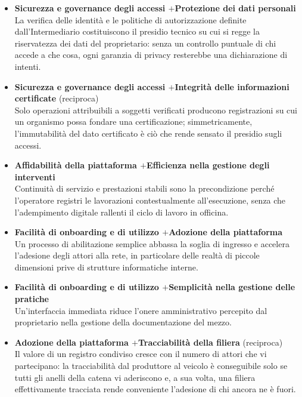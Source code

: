 \begin{itemize}
    \item \textbf{Sicurezza e governance degli accessi \quad$+$\quad Protezione dei dati personali}\\
    La verifica delle identit\`a e le politiche di autorizzazione definite dall'Intermediario costituiscono il presidio tecnico su cui si regge la riservatezza dei dati del proprietario: senza un controllo puntuale di chi accede a che cosa, ogni garanzia di privacy resterebbe una dichiarazione di intenti.

    \item \textbf{Sicurezza e governance degli accessi \quad$+$\quad Integrit\`a delle informazioni certificate} (reciproca)\\
    Solo operazioni attribuibili a soggetti verificati producono registrazioni su cui un organismo possa fondare una certificazione; simmetricamente, l'immutabilit\`a del dato certificato \`e ci\`o che rende sensato il presidio sugli accessi.

    \item \textbf{Affidabilit\`a della piattaforma \quad$+$\quad Efficienza nella gestione degli interventi}\\
    Continuit\`a di servizio e prestazioni stabili sono la precondizione perch\'e l'operatore registri le lavorazioni contestualmente all'esecuzione, senza che l'adempimento digitale rallenti il ciclo di lavoro in officina.

    \item \textbf{Facilit\`a di onboarding e di utilizzo \quad$+$\quad Adozione della piattaforma}\\
    Un processo di abilitazione semplice abbassa la soglia di ingresso e accelera l'adesione degli attori alla rete, in particolare delle realt\`a di piccole dimensioni prive di strutture informatiche interne.

    \item \textbf{Facilit\`a di onboarding e di utilizzo \quad$+$\quad Semplicit\`a nella gestione delle pratiche}\\
    Un'interfaccia immediata riduce l'onere amministrativo percepito dal proprietario nella gestione della documentazione del mezzo.

    \item \textbf{Adozione della piattaforma \quad$+$\quad Tracciabilit\`a della filiera} (reciproca)\\
    Il valore di un registro condiviso cresce con il numero di attori che vi partecipano: la tracciabilit\`a dal produttore al veicolo \`e conseguibile solo se tutti gli anelli della catena vi aderiscono e, a sua volta, una filiera effettivamente tracciata rende conveniente l'adesione di chi ancora ne \`e fuori.


\end{itemize}
